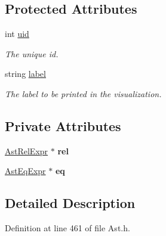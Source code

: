 \subsection*{Protected Attributes}
\begin{DoxyCompactItemize}
\item 
\hypertarget{classAST_a847b778f1c3dd5a19de32de432ee6e15}{int \hyperlink{classAST_a847b778f1c3dd5a19de32de432ee6e15}{uid}}\label{classAST_a847b778f1c3dd5a19de32de432ee6e15}

\begin{DoxyCompactList}\small\item\em The unique id. \end{DoxyCompactList}\item 
\hypertarget{classAST_ab2e239ccc0688d2341724432ff5a1a31}{string \hyperlink{classAST_ab2e239ccc0688d2341724432ff5a1a31}{label}}\label{classAST_ab2e239ccc0688d2341724432ff5a1a31}

\begin{DoxyCompactList}\small\item\em The label to be printed in the visualization. \end{DoxyCompactList}\end{DoxyCompactItemize}
\subsection*{Private Attributes}
\begin{DoxyCompactItemize}
\item 
\hypertarget{classAstEqExpr_a82c0a1509d0185b5c9821a5e297be3a7}{\hyperlink{classAstRelExpr}{Ast\-Rel\-Expr} $\ast$ {\bfseries rel}}\label{classAstEqExpr_a82c0a1509d0185b5c9821a5e297be3a7}

\item 
\hypertarget{classAstEqExpr_ad882edd61dbb94d1747c670be5548b2d}{\hyperlink{classAstEqExpr}{Ast\-Eq\-Expr} $\ast$ {\bfseries eq}}\label{classAstEqExpr_ad882edd61dbb94d1747c670be5548b2d}

\end{DoxyCompactItemize}


\subsection{Detailed Description}


Definition at line 461 of file Ast.\-h.



